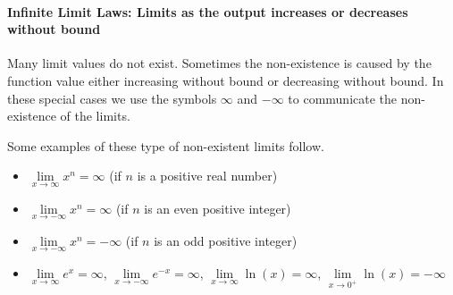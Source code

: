 \documentclass[10pt,oneside,]{book}
\theoremstyle{plain}
\theoremstyle{definition}
\numberwithin{equation}{section}
\newcommand{\fe}[2]{#1\mathopen{}\left(#2\right)\mathclose{}}
\begin{document}
\paragraph[Infinite Limit Laws: Limits as the output increases or decreases without bound ]{Infinite Limit Laws: Limits as the output increases or decreases without bound }\label{paragraphs-75}
Many limit values do not exist.  Sometimes the non-existence is caused by the function value either increasing without bound or decreasing without bound.  In these special cases we use the symbols \(\infty\) and \(-\infty\) to communicate the non-existence of the limits.%
\par
Some examples of these type of non-existent limits follow.%
\begin{itemize}[label=\textbullet]
\item{}\(\lim\limits_{x\to\infty}x^n=\infty\) (if \(n\) is a positive real number)\item{}\(\lim\limits_{x\to-\infty}x^n=\infty\) (if \(n\) is an even positive integer)\item{}\(\lim\limits_{x\to-\infty}x^n=-\infty\) (if \(n\) is an odd positive integer)\item{}\(\lim\limits_{x\to\infty}e^x=\infty\), \(\lim\limits_{x\to-\infty}e^{-x}=\infty\), \(\lim\limits_{x\to\infty}\fe{\ln}{x}=\infty\), \(\lim\limits_{x\to0^{+}}\fe{\ln}{x}=-\infty\)\end{itemize}
\typeout{************************************************}
\typeout{************************************************}
\end{document}
